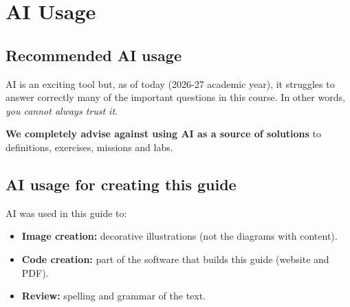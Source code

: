 \newpage

\section*{AI Usage}

\subsection*{Recommended AI usage}

\noindent AI is an exciting tool but, as of today (2026-27 academic year), it struggles to answer correctly many of the important questions in this course. In other words, \textit{you cannot always trust it}.

\textbf{We completely advise against using AI as a source of solutions} to definitions, exercises, missions and labs.

\subsection*{AI usage for creating this guide}

\noindent AI was used in this guide to:

\begin{itemize}
\item \textbf{Image creation:} decorative illustrations (not the diagrams with content).
\item \textbf{Code creation:} part of the software that builds this guide (website and PDF).
\item \textbf{Review:} spelling and grammar of the text.
\end{itemize}

\begin{center}
\end{center}


